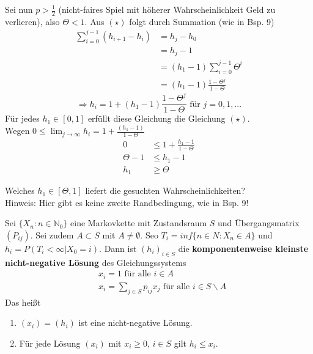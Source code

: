 \documentclass[a4paper,12pt]{article}
\begin{document}
\begin{tcolorbox}[breakable, colframe=blue, colback=white, title=Beispiel 10]
	Sei nun $p > \frac{1}{2}$ (nicht-faires Spiel mit höherer Wahrscheinlichkeit Geld zu verlieren), also $\Theta < 1$.
	Aus $(\star)$ folgt durch Summation (wie in Bsp. 9)
	\begin{align*}
		\sum_{i=0}^{j-1}(h_{i+1} - h_i) & = h_j - h_0                                \\
		                                & = h_j - 1                                  \\
		                                & = (h_1-1)\sum_{i=0}^{j-1}\Theta^{i}        \\
		                                & = (h_1 - 1)\frac{1- \Theta^{j}}{1- \Theta}
	\end{align*}
	$$
		\Rightarrow h_i = 1 + (h_1 - 1)\frac{1- \Theta^{j}}{1- \Theta} \text{ für } j = 0, 1, ...
	$$
	Für jedes $h_1 \in [0,1]$ erfüllt diese Gleichung die Gleichung $(\star)$.\\
	Wegen $0 \leq \lim_{j \to \infty}h_i = 1 + \frac{(h_1 - 1)}{1 - \Theta}$
	\begin{align*}
		0          & \leq 1+ \frac{h_1 - 1}{1- \Theta} \\
		\Theta - 1 & \leq h_1 - 1                      \\
		h_1        & \geq \Theta
	\end{align*}


	Welches $h_1 \in [\Theta, 1]$ liefert die gesuchten Wahrscheinlichkeiten?\\

	Hinweis: Hier gibt es keine zweite Randbedingung, wie in Bsp. 9!
\end{tcolorbox}


\begin{tcolorbox}[breakable, colframe=green, colback=white, title=Satz 11]
	Sei $\{X_n: n \in \mathbb{N}_0\}$ eine Markovkette mit Zustandsraum $S$ und Übergangsmatrix $(P_{ij})$.
	Sei zudem $A \subset S$ mit $A \neq \emptyset$. Seo $T_i = inf\{n \in N: X_n \in A\}$ und
	$h_i = P(T_i < \infty | X_0 = i)$.  Dann ist $(h_i)_{i \in S}$ die \textbf{komponentenweise kleinste nicht-negative Lösung}
	des Gleichungssystems
	\begin{align*}
		 & x_i = 1 \text{ für alle } i \in A                                    \\
		 & x_i = \sum_{j \in S}p_{ij}x_j \text{ für alle } i \in S \backslash A
	\end{align*}
	Das heißt
	\begin{enumerate}
		\item $(x_i) = (h_i)$ ist eine nicht-negative Lösung.
		\item Für jede Lösung $(x_i)$ mit $x_i \geq 0$, $i \in S$ gilt $h_i \leq x_i$.
	\end{enumerate}
\end{tcolorbox}
\end{document}
